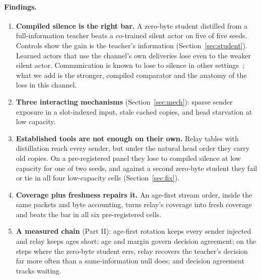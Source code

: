 \documentclass[11pt]{article}
\theoremstyle{definition}
\begin{document}
\paragraph{Findings.}
\begin{enumerate}
\item \textbf{Compiled silence is the right bar.} A zero-byte student distilled from a full-information teacher beats a
co-trained silent actor on five of five seeds. Controls show the gain is the teacher's information
(Section~\ref{sec:student}). Learned actors that use the channel's own deliveries lose even to the weaker silent actor.
Communication is known to lose to silence in other settings~\cite{chauhan2026,caic}; what we add is the stronger,
compiled comparator and the anatomy of the loss in this channel.
\item \textbf{Three interacting mechanisms} (Section~\ref{sec:mech}): sparse sender exposure in a slot-indexed input,
stale cached copies, and head starvation at low capacity.
\item \textbf{Established tools are not enough on their own.} Relay tables with distillation reach every sender, but
under the natural head order they carry old copies. On a pre-registered panel they lose to compiled silence at low
capacity for one of two seeds, and against a second zero-byte student they fail or tie in all four low-capacity cells
(Section~\ref{sec:fix}).
\item \textbf{Coverage plus freshness repairs it.} An age-first stream order, inside the same packets and byte accounting,
turns relay's coverage into fresh coverage and beats the bar in all six pre-registered cells.
\item \textbf{A measured chain} (Part II): age-first rotation keeps every sender injected and relay keeps ages short; age and margin govern decision agreement; on the steps where the zero-byte student errs, relay recovers the teacher's decision far more often than a
same-information null does; and decision agreement tracks waiting.
\end{enumerate}
\end{document}
